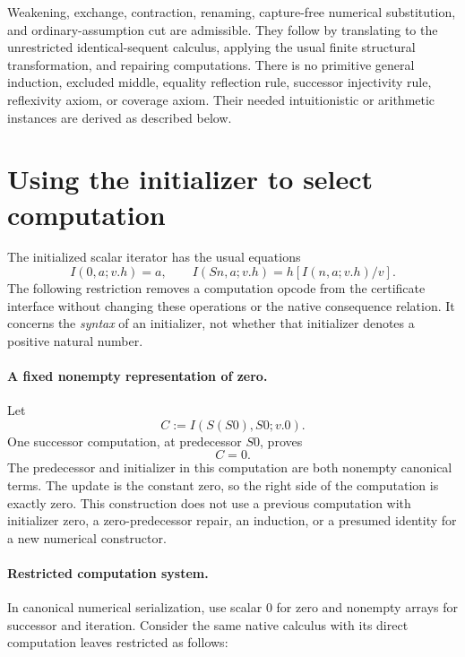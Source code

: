 \documentclass[11pt,letterpaper]{article}
\theoremstyle{definition}\newtheorem{definition}[theorem]{Definition}
\theoremstyle{remark}\newtheorem{remark}[theorem]{Remark}
\begin{document}
Weakening, exchange, contraction, renaming, capture-free numerical
substitution, and ordinary-assumption cut are admissible. They follow
by translating to the unrestricted identical-sequent calculus, applying
the usual finite structural transformation, and repairing computations.
There is no primitive general induction, excluded middle, equality
reflection rule, successor injectivity rule, reflexivity axiom, or
coverage axiom. Their needed intuitionistic or arithmetic instances
are derived as described below.



\section{Using the initializer to select computation}
\label{sec:seed-dispatch}

The initialized scalar iterator has the usual equations
\[
 I(0,a;v.h)=a,\qquad
 I(Sn,a;v.h)=h[I(n,a;v.h)/v].
 \tag{I0, IS}
\]
The following restriction removes a computation opcode from the
certificate interface without changing these operations or the native
consequence relation.  It concerns the \emph{syntax} of an initializer,
not whether that initializer denotes a positive natural number.

\paragraph{A fixed nonempty representation of zero.}
Let
\[
               C:=I(S(S0),S0;v.0).
 \tag{Auxiliary zero}\label{eq:dispatch-zero-term}
\]
One successor computation, at predecessor $S0$, proves
\[
                              C=0.\label{eq:dispatch-zero}
 \tag{Zero certificate}
\]
The predecessor and initializer in this computation are both nonempty
canonical terms.  The update is the constant zero, so the right side of
the computation is exactly zero.  This construction does not use a
previous computation with initializer zero, a zero-predecessor repair,
an induction, or a presumed identity for a new numerical constructor.

\paragraph{Restricted computation system.}
In canonical numerical serialization, use scalar $0$ for zero and
nonempty arrays for successor and iteration.  Consider the same native
calculus with its direct computation leaves restricted as follows:
\end{document}
